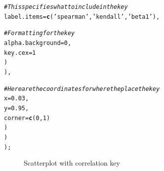 \documentclass[letterpaper]{article}\usepackage[]{graphicx}\usepackage[]{color}
\makeatletter
\newcommand{\hlnum}[1]{\textcolor[rgb]{0.686,0.059,0.569}{#1}}%
\newcommand{\hlstr}[1]{\textcolor[rgb]{0.192,0.494,0.8}{#1}}%
\newcommand{\hlcom}[1]{\textcolor[rgb]{0.678,0.584,0.686}{\textit{#1}}}%
\newcommand{\hlstd}[1]{\textcolor[rgb]{0.345,0.345,0.345}{#1}}%
\newcommand{\hlkwc}[1]{\textcolor[rgb]{0.333,0.667,0.333}{#1}}%
\newcommand{\hlkwd}[1]{\textcolor[rgb]{0.737,0.353,0.396}{\textbf{#1}}}%
\newenvironment{kframe}{%
 \def\at@end@of@kframe{}%
 \ifinner\ifhmode%
  \def\at@end@of@kframe{\end{minipage}}%
  \begin{minipage}{\columnwidth}%
 \fi\fi%
 \def\FrameCommand##1{\hskip\@totalleftmargin \hskip-\fboxsep
 \colorbox{shadecolor}{##1}\hskip-\fboxsep
     \hskip-\linewidth \hskip-\@totalleftmargin \hskip\columnwidth}%
 \MakeFramed {\advance\hsize-\width
   \@totalleftmargin\z@ \linewidth\hsize
   \@setminipage}}%
 {\par\unskip\endMakeFramed%
 \at@end@of@kframe}
\newenvironment{knitrout}{}{} %
\makeatother
\begin{document}
\begin{knitrout}
\begin{kframe}
\begin{alltt}
                    \hlcom{# This specifies what to include in the key}
                    \hlkwc{label.items} \hlstd{=} \hlkwd{c}\hlstd{(}\hlstr{'spearman'}\hlstd{,}\hlstr{'kendall'}\hlstd{,}\hlstr{'beta1'}\hlstd{),}

                    \hlcom{# Formatting for the key}
                    \hlkwc{alpha.background} \hlstd{=} \hlnum{0}\hlstd{,}
                    \hlkwc{key.cex} \hlstd{=} \hlnum{1}
                    \hlstd{)}
                \hlstd{),}

            \hlcom{# Here are the coordinates for where the place the key}
            \hlkwc{x} \hlstd{=} \hlnum{0.03}\hlstd{,}
            \hlkwc{y} \hlstd{=} \hlnum{0.95}\hlstd{,}
            \hlkwc{corner} \hlstd{=} \hlkwd{c}\hlstd{(}\hlnum{0}\hlstd{,}\hlnum{1}\hlstd{)}
            \hlstd{)}
        \hlstd{)}
    \hlstd{);}
\end{alltt}
\end{kframe}\begin{figure}[]


{\centering {} 

}

\caption[Scatterplot with correlation key]{Scatterplot with correlation key\label{fig:scatter5}}
\end{figure}


\end{knitrout}
\end{document}
